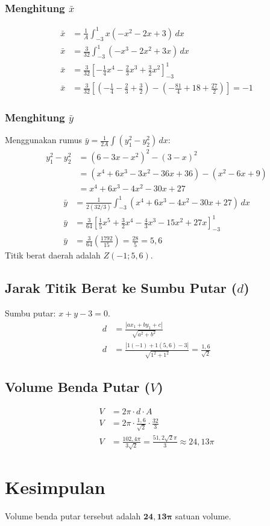 \documentclass[12pt,a4paper]{article}
\begin{document}
\subsubsection{Menghitung $\bar{x}$}
\begin{align*}
  \bar{x} &= \frac{1}{A} \int_{-3}^{1} x(-x^2 - 2x + 3) \, dx \\
  \bar{x} &= \frac{3}{32} \int_{-3}^{1} (-x^3 - 2x^2 + 3x) \, dx \\
  \bar{x} &= \frac{3}{32} \left[ -\frac{1}{4}x^4 - \frac{2}{3}x^3 + \frac{3}{2}x^2 \right]_{-3}^{1} \\
  \bar{x} &= \frac{3}{32} \left[ \left( -\frac{1}{4} - \frac{2}{3} + \frac{3}{2} \right) - \left( -\frac{81}{4} + 18 + \frac{27}{2} \right) \right] = -1
\end{align*}

\subsubsection{Menghitung $\bar{y}$}
Menggunakan rumus $\bar{y} = \frac{1}{2A} \int (y_1^2 - y_2^2) \, dx$:
\begin{align*}
  y_1^2 - y_2^2 &= (6 - 3x - x^2)^2 - (3 - x)^2 \\
  &= (x^4 + 6x^3 - 3x^2 - 36x + 36) - (x^2 - 6x + 9) \\
  &= x^4 + 6x^3 - 4x^2 - 30x + 27
\end{align*}
\begin{align*}
  \bar{y} &= \frac{1}{2(32/3)} \int_{-3}^{1} (x^4 + 6x^3 - 4x^2 - 30x + 27) \, dx \\
  \bar{y} &= \frac{3}{64} \left[ \frac{1}{5}x^5 + \frac{3}{2}x^4 - \frac{4}{3}x^3 - 15x^2 + 27x \right]_{-3}^{1} \\
  \bar{y} &= \frac{3}{64} \left( \frac{1792}{15} \right) = \frac{28}{5} = 5,6
\end{align*}
Titik berat daerah adalah $Z(-1; 5,6)$.

\subsection{Jarak Titik Berat ke Sumbu Putar ($d$)}
Sumbu putar: $x + y - 3 = 0$.
\begin{align*}
  d &= \frac{|ax_1 + by_1 + c|}{\sqrt{a^2 + b^2}} \\
  d &= \frac{|1(-1) + 1(5,6) - 3|}{\sqrt{1^2 + 1^2}} = \frac{1,6}{\sqrt{2}}
\end{align*}

\subsection{Volume Benda Putar ($V$)}
\begin{align*}
  V &= 2\pi \cdot d \cdot A \\
  V &= 2\pi \cdot \frac{1,6}{\sqrt{2}} \cdot \frac{32}{3} \\
  V &= \frac{102,4\pi}{3\sqrt{2}} = \frac{51,2\sqrt{2}\pi}{3} \approx 24,13\pi
\end{align*}

\section{Kesimpulan}
Volume benda putar tersebut adalah $\mathbf{24,13\pi}$ satuan volume.
\end{document}
